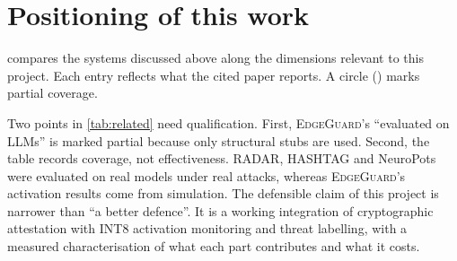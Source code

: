 \section{Positioning of this work}
\label{sec:rw:gap}

 compares the systems discussed above along the dimensions relevant to this
project. Each entry reflects what the cited paper reports. A circle (\pmark) marks partial
coverage.

\begin{table}[t]
\centering
\caption{Coverage of related defences. \cmark: addressed; \pmark: partially; \xmark: not
addressed in the cited work. ``Localises'' means the defence identifies where the modification
occurred.}
\label{tab:related}
\small
{}
\end{table}

Two points in \cref{tab:related} need qualification. First, \textsc{EdgeGuard}'s ``evaluated on
LLMs'' is marked partial because only structural stubs are used. Second, the table records
coverage, not effectiveness. RADAR, HASHTAG and NeuroPots were evaluated on real models under
real attacks, whereas \textsc{EdgeGuard}'s activation results come from simulation. The defensible
claim of this project is narrower than ``a better defence''. It is a working integration of
cryptographic attestation with INT8 activation monitoring and threat labelling, with a measured
characterisation of what each part contributes and what it costs.
